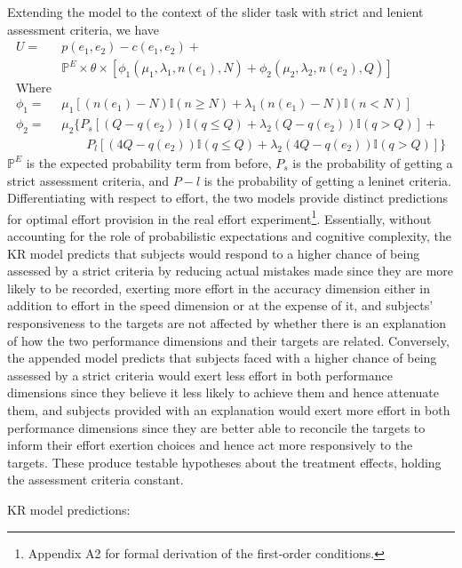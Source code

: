\documentclass[12pt, letterpaper, DIV=11, numbers=noendperiod]{article}
\begin{document}
Extending the model to the context of the slider task with strict and lenient assessment criteria, we have
\[
\begin{aligned}
U = & p(e_1, e_2) - c(e_1, e_2) + \nonumber \\
    & \mathbb{P}^E \times \theta \times [\phi_1(\mu_1, \lambda_1, n(e_1), N) + \phi_2(\mu_2, \lambda_2, n(e_2), Q)] \nonumber \\
\text{Where}
\\
\phi_1 = & \mu_1[(n(e_1)-N)\mathbb{I}(n \geq N) + \lambda_1(n(e_1)-N)\mathbb{I}(n<N)] \nonumber \\
\phi_2 = & \mu_2 \{P_s[(Q-q(e_2))\mathbb{I}(q \leq Q) + \lambda_2(Q-q(e_2))\mathbb{I}(q>Q)] + \nonumber \\
& \qquad P_l[(4Q-q(e_2))\mathbb{I}(q \leq Q) + \lambda_2(4Q-q(e_2))\mathbb{I}(q>Q)]\}
\end{aligned}
\]
\(\mathbb{P}^E\) is the expected probability term from before, \(P_s\) is the probability of getting a strict assessment criteria, and \(P-l\) is the probability of getting a leninet criteria. Differentiating with respect to effort, the two models provide distinct predictions for optimal effort provision in the real effort experiment\footnote{Appendix A2 for formal derivation of the first-order conditions.}. Essentially, without accounting for the role of probabilistic expectations and cognitive complexity, the KR model predicts that subjects would respond to a higher chance of being assessed by a strict criteria by reducing actual mistakes made since they are more likely to be recorded, exerting more effort in the accuracy dimension either in addition to effort in the speed dimension or at the expense of it, and subjects' responsiveness to the targets are not affected by whether there is an explanation of how the two performance dimensions and their targets are related. Conversely, the appended model predicts that subjects faced with a higher chance of being assessed by a strict criteria would exert less effort in both performance dimensions since they believe it less likely to achieve them and hence attenuate them, and subjects provided with an explanation would exert more effort in both performance dimensions since they are better able to reconcile the targets to inform their effort exertion choices and hence act more responsively to the targets. These produce testable hypotheses about the treatment effects, holding the assessment criteria constant.

\noindent KR model predictions:
\end{document}
